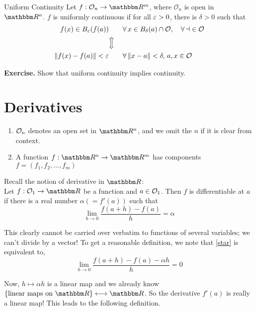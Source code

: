 \documentclass[../Analysis-3]{subfiles}
\begin{document}
\begin{Def}{Uniform Continuity}{}
  Let $ f : \mathcal{O}_n \to \R^m $, where $ \mathcal{O}_n $ is open in $ \R^n $. $ f $ is uniformly continuous if for all $ \varepsilon > 0 $, there is $ \delta > 0 $ such that
  \begin{alignat*}{2}
    f(x) \in B_\varepsilon(f(a))     & \quad            &  & \forall \, x \in B_\delta(a) \cap \cal O, \quad \forall \, a \in \cal O \\
                               & \Big\Updownarrow                                                                              \\
    \norm{f(x) - f(a)} < \varepsilon & \quad            &  & \forall \, \norm{x - a} < \delta, \, a,x \in \cal O
  \end{alignat*}
\end{Def}

\textbf{Exercise.} Show that uniform continuity implies continuity.

\section{Derivatives}

\begin{notnBox}{}{}
  \begin{enumerate}[label = (\arabic*)]
    \item $ {\cal O}_n $ denotes an open set in $ \R^n $, and we omit the $ n $ if it is clear from context.
    \item A function $ f:\R^n \to \R^m $ has components $ f = (f_1, f_2, \dots, f_m) $
  \end{enumerate}
\end{notnBox}
\ssk

Recall the notion of derivative in $ \R $: \\
Let $ f : {\cal O}_1 \to \R $ be a function and $ a \in {\cal O}_1 $. Then $ f $ is differentiable at $ a $ if there is a real number $ \alpha (= f'(a)) $ such that
\[ \lim_{h \to 0}\frac{f(a+h)-f(a)}{h} = \alpha \label{star}\tag{1} \]

This clearly cannot be carried over verbatim to functions of several variables; we can't divide by a vector! To get a reasonable definition, we note that \eqref{star} is equivalent to,
\[ \lim_{h \to 0}\frac{f(a+h)-f(a)-\alpha h}{h} = 0 \]

Now, $ h \mapsto \alpha h $ is a linear map and we already know $ \{\text{linear maps on } \R\} \longleftrightarrow \R $. So the derivative $ f'(a) $ is really a linear map! This leads to the following definition.
\end{document}

